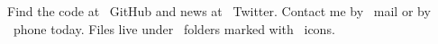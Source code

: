 \documentclass{article}
\begin{document}
Find the code at \faGithub\ GitHub and news at \faTwitter\ Twitter.
Contact me by \faEnvelope\ mail or by \faPhone\ phone today.
Files live under \faFolder\ folders marked with \faFile\ icons.
\end{document}
